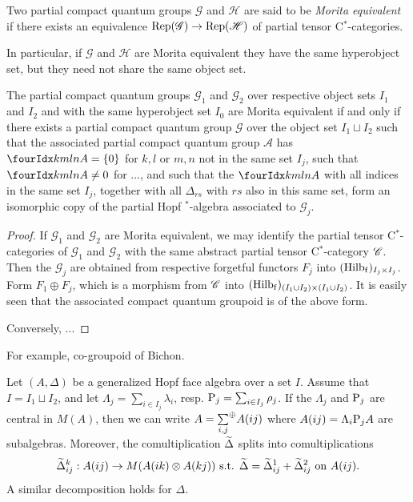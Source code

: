 
\begin{Def} Two partial compact quantum groups $\mathscr{G}$ and $\mathscr{H}$ are said to be \emph{Morita equivalent} if there exists an equivalence $\mathrm{Rep}(\mathscr{G}) \rightarrow \mathrm{Rep}(\mathscr{H})$ of partial tensor C$^*$-categories. %
\end{Def} 

In particular, if $\mathscr{G}$ and $\mathscr{H}$ are Morita equivalent they have the same hyperobject set, but they need not share the same object set.

\begin{Prop} The partial compact quantum groups $\mathscr{G}_1$ and $\mathscr{G}_2$ over respective object sets $I_1$ and $I_2$ and with the same hyperobject set $I_0$ are Morita equivalent if and only if there exists a partial compact quantum group $\mathscr{G}$ over the object set $I_1\sqcup I_2$ such that the associated partial compact quantum group $\mathscr{A}$ has $\Gr{A}{k}{l}{m}{n}=\{0\}$ for $k,l$ or $m,n$ not in the same set $I_j$, such that $\Gr{A}{k}{l}{m}{n}\neq 0$ for ..., and such that the $\Gr{A}{k}{l}{m}{n}$ with all indices in the same set $I_j$, together with all $\Delta_{rs}$ with $rs$ also in this same set, form an isomorphic copy of the partial Hopf $^*$-algebra associated to $\mathscr{G}_j$. %
\end{Prop}
\begin{proof} If $\mathscr{G}_1$ and $\mathscr{G}_2$ are Morita equivalent, we may identify the partial tensor C$^*$-categories of $\mathscr{G}_1$ and $\mathscr{G}_2$ with the same abstract partial tensor C$^*$-category $\mathscr{C}$. Then the $\mathscr{G}_j$ are obtained from respective forgetful functors $F_j$ into $(\mathrm{Hilb}_{\operatorname{\mathrm{f}}})_{I_j\times I_j}$. Form $F_1\oplus F_j$, which is a morphism from $\mathscr{C}$ into $(\mathrm{Hilb}_{\operatorname{\mathrm{f}}})_{(I_1\cup I_2)\times (I_1\cup I_2)}$. It is easily seen that the associated compact quantum groupoid is of the above form.

Conversely, ...
\end{proof} 

For example, co-groupoid of Bichon. 

Let $(A,\Delta)$ be a generalized Hopf face algebra over a set $I$. Assume that $I = I_1\sqcup I_2$, and let $\Lambda_j = \sum_{i\in I_j}\lambda_i$, resp. $\mathrm{P}_j = \sum_{i\in I_j} \rho_j$. If the $\Lambda_j$ and $\mathrm{P}_j$ are central in $M(A)$, then we can write $A = \underset{i,j}{\sum}^{\oplus} A(ij)$ where $A(ij) = \Lambda_i\mathrm{P}_jA$ are subalgebras. Moreover, the comultiplication $\widetilde{\Delta}$ splits into comultiplications \[\widetilde{\Delta}_{ij}^k:A(ij)\rightarrow M(A(ik)\otimes A(kj))\textrm{ s.t. } \widetilde{\Delta} = \widetilde{\Delta}_{ij}^1 +\widetilde{\Delta}_{ij}^2 \textrm{ on }A(ij).\] A similar decomposition holds for $\Delta$.

